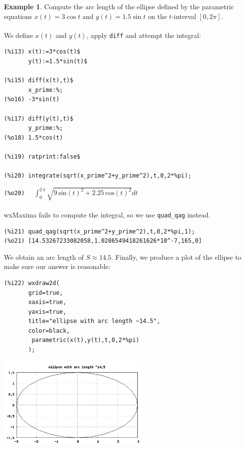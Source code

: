 \documentclass[10.5pt,twoside]{report}
\theoremstyle{definition}
\newtheorem{exmp}{Example}[section]
\begin{document}
\begin{exmp} Compute the arc length of the ellipse defined by the parametric equations $x(t)=3\cos{t}$ and $y(t)=1.5\sin{t}$ on the $t$-interval $[0,2\pi]$.\\

${}$\\

We define $x(t)$ and $y(t)$, apply \verb|diff| and attempt the integral:

\begin{verbatim}
(%i13) x(t):=3*cos(t)$
       y(t):=1.5*sin(t)$
         
(%i15) diff(x(t),t)$
       x_prime:%;      
(%o16) -3*sin(t)

(%i17) diff(y(t),t)$
       y_prime:%;
(%o18) 1.5*cos(t)

(%i19) ratprint:false$

(%i20) integrate(sqrt(x_prime^2+y_prime^2),t,0,2*%pi);
\end{verbatim}

\verb|(%o20)  | $\displaystyle \int_{0}^{2\,\pi }\sqrt{9\,{\mathrm{sin}\left( t\right) }^{2}+2.25\,{\mathrm{cos}\left( t\right) }^{2}}dt$\\

${}$\\

wxMaxima fails to compute the integral, so we use \verb|quad_qag| instead.  

\begin{verbatim}
(%i21) quad_qag(sqrt(x_prime^2+y_prime^2),t,0,2*%pi,1);
(%o21) [14.53267233082058,1.0286549418261626*10^-7,165,0]
\end{verbatim}

We obtain an arc length of $S\approx 14.5$.  Finally, we produce a plot of the ellipse to make sure our answer is reasonable:

\begin{verbatim}
(%i22) wxdraw2d(
       grid=true,
       xaxis=true,
       yaxis=true,
       title="ellipse with arc length ~14.5",
       color=black,
        parametric(x(t),y(t),t,0,2*%pi)
       );
\end{verbatim}

\includegraphics[width=3in]{example_5_2_3_1}

\end{exmp}
\end{document}

